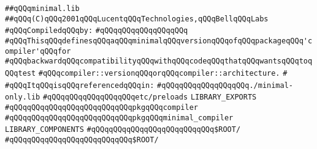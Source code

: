 \label{src/lib/core/compiler/minimal.lib}
\verb|##qQQqminimal.lib|\newline
\verb|##qQQq(C)qQQq2001qQQqLucentqQQqTechnologies,qQQqBellqQQqLabs|\newline
\newline
\verb|#qQQqCompiledqQQqby:|\newline
\verb|#qQQqqQQqqQQqqQQqqQQq|\newline
\newline
\newline
\newline
\verb|#qQQqThisqQQqdefinesqQQqaqQQqminimalqQQqversionqQQqofqQQqpackageqQQq'compiler'qQQqfor|\newline
\verb|#qQQqbackwardqQQqcompatibilityqQQqwithqQQqcodeqQQqthatqQQqwantsqQQqtoqQQqtest|\newline
\verb|#qQQqcompiler::versionqQQqorqQQqcompiler::architecture.|\newline
\verb|#|\newline
\verb|#qQQqItqQQqisqQQqreferencedqQQqin:|\newline
\verb|#qQQqqQQqqQQqqQQqqQQq./minimal-only.lib|\newline
\verb|#qQQqqQQqqQQqqQQqqQQqetc/preloads|\newline
\newline
\newline
\verb|LIBRARY_EXPORTS|\newline
\newline
\verb|#qQQqqQQqqQQqqQQqqQQqqQQqqQQqpkgqQQqcompiler|\newline
\verb|#qQQqqQQqqQQqqQQqqQQqqQQqqQQqpkgqQQqminimal_compiler|\newline
\newline
\newline
\newline
\verb|LIBRARY_COMPONENTS|\newline
\newline
\verb|#qQQqqQQqqQQqqQQqqQQqqQQqqQQq$ROOT/|\newline
\verb|#qQQqqQQqqQQqqQQqqQQqqQQqqQQq$ROOT/|\newline

